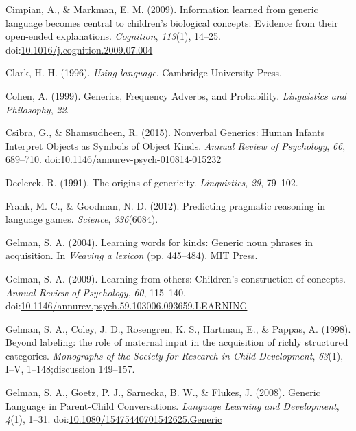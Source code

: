 \documentclass[floatsintext,doc]{apa6}
\begin{document}
\leavevmode\hypertarget{ref-Cimpian2009:explanations}{}%
Cimpian, A., \& Markman, E. M. (2009). Information learned from generic language becomes central to children's biological concepts: Evidence from their open-ended explanations. \emph{Cognition}, \emph{113}(1), 14--25. doi:\href{https://doi.org/10.1016/j.cognition.2009.07.004}{10.1016/j.cognition.2009.07.004}

\leavevmode\hypertarget{ref-Clark1996}{}%
Clark, H. H. (1996). \emph{Using language}. Cambridge University Press.

\leavevmode\hypertarget{ref-Cohen1999}{}%
Cohen, A. (1999). Generics, Frequency Adverbs, and Probability. \emph{Linguistics and Philosophy}, \emph{22}.

\leavevmode\hypertarget{ref-Csibra2015}{}%
Csibra, G., \& Shamsudheen, R. (2015). Nonverbal Generics: Human Infants Interpret Objects as Symbols of Object Kinds. \emph{Annual Review of Psychology}, \emph{66}, 689--710. doi:\href{https://doi.org/10.1146/annurev-psych-010814-015232}{10.1146/annurev-psych-010814-015232}

\leavevmode\hypertarget{ref-Declerck1991}{}%
Declerck, R. (1991). The origins of genericity. \emph{Linguistics}, \emph{29}, 79--102.

\leavevmode\hypertarget{ref-Frank2012}{}%
Frank, M. C., \& Goodman, N. D. (2012). Predicting pragmatic reasoning in language games. \emph{Science}, \emph{336}(6084).

\leavevmode\hypertarget{ref-Gelman2004}{}%
Gelman, S. A. (2004). Learning words for kinds: Generic noun phrases in acquisition. In \emph{Weaving a lexicon} (pp. 445--484). MIT Press.

\leavevmode\hypertarget{ref-Gelman2009}{}%
Gelman, S. A. (2009). Learning from others: Children's construction of concepts. \emph{Annual Review of Psychology}, \emph{60}, 115--140. doi:\href{https://doi.org/10.1146/annurev.psych.59.103006.093659.LEARNING}{10.1146/annurev.psych.59.103006.093659.LEARNING}

\leavevmode\hypertarget{ref-Gelman1998}{}%
Gelman, S. A., Coley, J. D., Rosengren, K. S., Hartman, E., \& Pappas, A. (1998). Beyond labeling: the role of maternal input in the acquisition of richly structured categories. \emph{Monographs of the Society for Research in Child Development}, \emph{63}(1), I--V, 1--148;discussion 149--157.

\leavevmode\hypertarget{ref-Gelman2008}{}%
Gelman, S. A., Goetz, P. J., Sarnecka, B. W., \& Flukes, J. (2008). Generic Language in Parent-Child Conversations. \emph{Language Learning and Development}, \emph{4}(1), 1--31. doi:\href{https://doi.org/10.1080/15475440701542625.Generic}{10.1080/15475440701542625.Generic}
\end{document}
